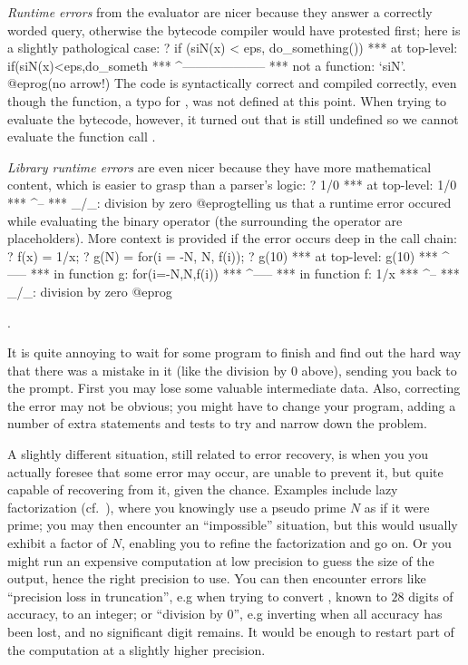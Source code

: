 \emph{Runtime errors} from the evaluator are nicer because they answer a
correctly worded query, otherwise the bytecode compiler would have protested
first; here is a slightly pathological case:
\bprog
? if (siN(x) < eps, do_something())
  ***   at top-level: if(siN(x)<eps,do_someth
  ***                    ^--------------------
  ***   not a function: `siN'.
@eprog\noindent (no arrow!) The code is syntactically correct and compiled
correctly, even though the  function, a typo for , was not
defined at this point. When trying to evaluate the bytecode, however, it
turned out that  is still undefined so we cannot evaluate the
function call .

\emph{Library runtime errors} are even nicer because they have more
mathematical content, which is easier to grasp than a parser's logic:
\bprog
? 1/0
  ***   at top-level: 1/0
  ***                  ^--
  *** _/_: division by zero
@eprog\noindent telling us that a runtime error occured while evaluating the
binary \kbd{/} operator (the \kbd{\_} surrounding the operator are
placeholders). More context is provided if the error occurs deep in the
call chain:
\bprog
? f(x) = 1/x;
? g(N) = for(i = -N, N, f(i));
? g(10)
  ***   at top-level: g(10)
  ***                 ^-----
  ***   in function g: for(i=-N,N,f(i))
  ***                             ^-----
  ***   in function f: 1/x
  ***                   ^--
  *** _/_: division by zero
@eprog

.\label{se:errorrec}

It is quite annoying to wait for some program to finish and find out the hard
way that there was a mistake in it (like the division by 0 above), sending
you back to the prompt. First you may lose some valuable intermediate data.
Also, correcting the error may not be obvious; you might have to change your
program, adding a number of extra statements and tests to try and narrow down
the problem.

A slightly different situation, still related to error recovery, is when you
you actually foresee that some error may occur, are unable to prevent it, but
quite capable of recovering from it, given the chance. Examples include lazy
factorization (cf.~), where you knowingly use a pseudo prime
$N$ as if it were prime; you may then encounter an ``impossible'' situation,
but this would usually exhibit a factor of $N$, enabling you to refine the
factorization and go on. Or you might run an expensive computation at low
precision to guess the size of the output, hence the right precision to use.
You can then encounter errors like ``precision loss in truncation'', e.g when
trying to convert , known to $28$ digits of accuracy, to an
integer; or ``division by 0'', e.g inverting  when all accuracy
has been lost, and no significant digit remains. It would be enough to
restart part of the computation at a slightly higher precision.

